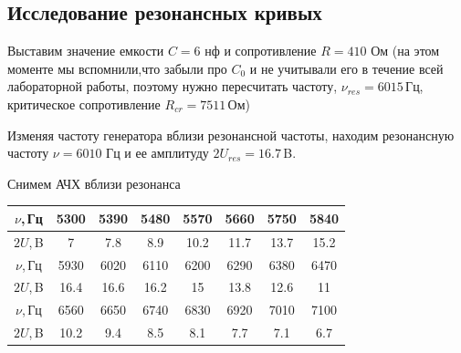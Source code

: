 \documentclass[a4paper,12pt]{article}
\theoremstyle{definition}
\begin{document}
\subsection{Исследование резонансных кривых}
Выставим значение емкости $C = 6$ нф и сопротивление $R = 410$ Ом (на этом моменте мы вспомнили,что забыли про $C_0$ и не учитывали его в течение всей лабораторной работы, поэтому нужно пересчитать частоту, $\nu_{res}=6015$\,Гц, критическое сопротивление $R_{cr}=7511$\,Ом)\par
Изменяя частоту генератора вблизи резонансной частоты, находим резонансную частоту $\nu = 6010$ Гц и ее амплитуду $2U_{res} = 16.7$\,B. \par
Снимем АЧХ вблизи резонанса \par
\begin{center}
    \begin{tabular}{|c||c|c|c|c|c|c|c|} \hline
        $\nu$,\,Гц & 5300 & 5390& 5480 & 5570 & 5660 & 5750 & 5840\\ \hline
        $2U$,\,B & 7 & 7.8 & 8.9 & 10.2 & 11.7 & 13.7 & 15.2 \\ \hline \hline
        $\nu$,\,Гц & 5930 & 6020& 6110 & 6200 & 6290 & 6380 & 6470 \\ \hline
        $2U$,\,B & 16.4 & 16.6 & 16.2 & 15 & 13.8 & 12.6 & 11\\ \hline \hline
        $\nu$,\,Гц & 6560 & 6650 & 6740 & 6830 & 6920 & 7010 & 7100 \\ \hline
        $2U$,\,B & 10.2 & 9.4 & 8.5 & 8.1 & 7.7 & 7.1 & 6.7 \\ \hline
    \end{tabular}
\end{center}
\end{document}
